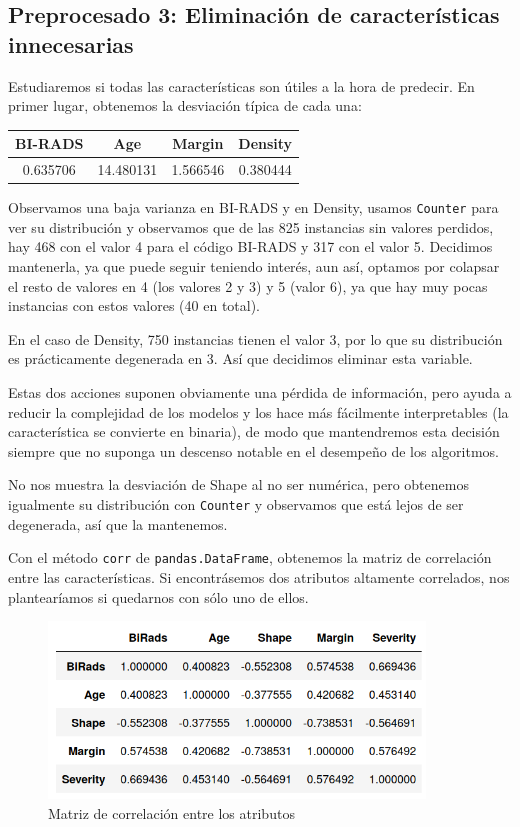 \documentclass{article}
\begin{document}
\subsection{Preprocesado 3: Eliminación de características innecesarias}

Estudiaremos si todas las características son útiles a la hora de
predecir. En primer lugar, obtenemos la desviación típica de cada una:

\begin{table}[H]
  \centering
  \begin{tabular}{cccc}
    BI-RADS &  Age & Margin & Density \\ \hline
	0.635706 & 14.480131 & 1.566546 & 0.380444
  \end{tabular}
\end{table}
Observamos una baja varianza en BI-RADS y en Density, usamos
\texttt{Counter} para ver su distribución y observamos que de las 825
instancias sin valores perdidos, hay 468 con el valor 4 para el código
BI-RADS y 317 con el valor 5. Decidimos mantenerla, ya que puede
seguir teniendo interés, aun así, optamos por colapsar el resto de
valores en 4 (los valores 2 y 3) y 5 (valor 6), ya que hay muy pocas
instancias con estos valores (40 en total). 

En el caso de Density, 750 instancias tienen el valor 3, por lo que su
distribución es prácticamente degenerada en 3. Así que decidimos
eliminar esta variable.

Estas dos acciones suponen obviamente una pérdida de información, pero
ayuda a reducir la complejidad de los modelos y los hace más
fácilmente interpretables (la característica se convierte en binaria),
de modo que mantendremos esta decisión siempre que no suponga un
descenso notable en el desempeño de los algoritmos.

No nos muestra la desviación de Shape al no ser numérica, pero
obtenemos igualmente su distribución con \texttt{Counter} y observamos
que está lejos de ser degenerada, así que la mantenemos.

Con el método \texttt{corr} de \texttt{pandas.DataFrame}, obtenemos la
matriz de correlación entre las características. Si encontrásemos dos
atributos altamente correlados, nos plantearíamos si quedarnos con
sólo uno de ellos.

\begin{figure}[H]
  \centering
  \includegraphics[width=100mm]{figures/corr}
  \caption{Matriz de correlación entre los atributos}
  \label{fig:corr}
\end{figure}
\end{document}
